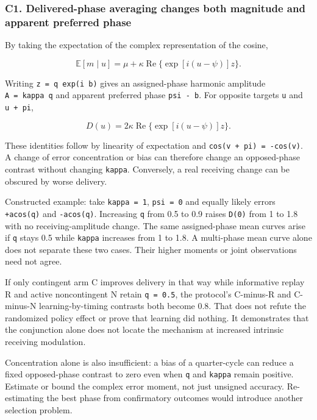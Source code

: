 \documentclass[
  american,
  11pt,
  letterpaper,
]{article}
\begin{document}
\subsubsection{C1. Delivered-phase averaging changes both magnitude and apparent preferred phase}\label{c1.-delivered-phase-averaging-changes-both-magnitude-and-apparent-preferred-phase}

By taking the expectation of the complex representation of the cosine,

\begin{equation}\mathbb E[m\mid u]=\mu+\kappa\operatorname{Re}\{\exp[i(u-\psi)]z\}.\tag{G1}\end{equation}

Writing \texttt{z\ =\ q\ exp(i\ b)} gives an assigned-phase harmonic amplitude \texttt{A\ =\ kappa\ q} and apparent preferred phase \texttt{psi\ -\ b}. For opposite targets \texttt{u} and \texttt{u\ +\ pi},

\begin{equation}D(u)=2\kappa\operatorname{Re}\{\exp[i(u-\psi)]z\}.\tag{G2}\end{equation}

These identities follow by linearity of expectation and \texttt{cos(v\ +\ pi)\ =\ -cos(v)}. A change of error concentration or bias can therefore change an opposed-phase contrast without changing \texttt{kappa}. Conversely, a real receiving change can be obscured by worse delivery.

Constructed example: take \texttt{kappa\ =\ 1}, \texttt{psi\ =\ 0} and equally likely errors \texttt{+acos(q)} and \texttt{-acos(q)}. Increasing \texttt{q} from 0.5 to 0.9 raises \texttt{D(0)} from 1 to 1.8 with no receiving-amplitude change. The same assigned-phase mean curves arise if \texttt{q} stays 0.5 while \texttt{kappa} increases from 1 to 1.8. A multi-phase mean curve alone does not separate these two cases. Their higher moments or joint observations need not agree.

If only contingent arm C improves delivery in that way while informative replay R and active noncontingent N retain \texttt{q\ =\ 0.5}, the protocol's C-minus-R and C-minus-N learning-by-timing contrasts both become 0.8. That does not refute the randomized policy effect or prove that learning did nothing. It demonstrates that the conjunction alone does not locate the mechanism at increased intrinsic receiving modulation.

Concentration alone is also insufficient: a bias of a quarter-cycle can reduce a fixed opposed-phase contrast to zero even when \texttt{q} and \texttt{kappa} remain positive. Estimate or bound the complex error moment, not just unsigned accuracy. Re-estimating the best phase from confirmatory outcomes would introduce another selection problem.
\end{document}
